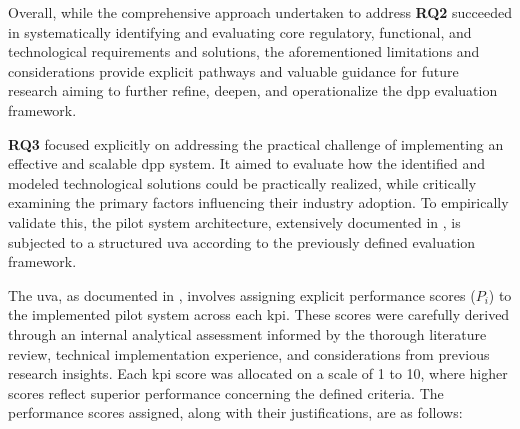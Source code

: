 Overall, while the comprehensive approach undertaken to address \textbf{RQ2} succeeded in systematically identifying and evaluating core regulatory, functional, and technological requirements and solutions, the aforementioned limitations and considerations provide explicit pathways and valuable guidance for future research aiming to further refine, deepen, and operationalize the \ac{dpp} evaluation framework.

\textbf{RQ3} focused explicitly on addressing the practical challenge of implementing an effective and scalable \ac{dpp} system. It aimed to evaluate how the identified and modeled technological solutions could be practically realized, while critically examining the primary factors influencing their industry adoption. To empirically validate this, the pilot system architecture, extensively documented in , is subjected to a structured \ac{uva} according to the previously defined evaluation framework.

The \ac{uva}, as documented in , involves assigning explicit performance scores (\(P_i\)) to the implemented pilot system across each \ac{kpi}. These scores were carefully derived through an internal analytical assessment informed by the thorough literature review, technical implementation experience, and considerations from previous research insights. Each \ac{kpi} score was allocated on a scale of 1 to 10, where higher scores reflect superior performance concerning the defined criteria. The performance scores assigned, along with their justifications, are as follows:

